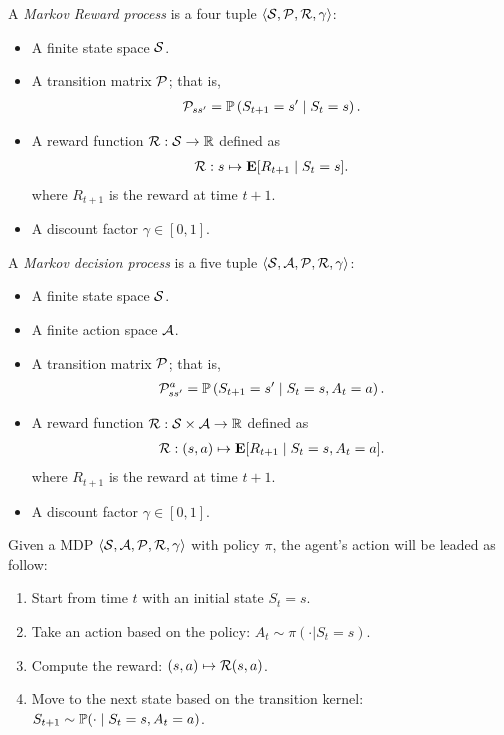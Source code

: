 \begin{definition}
	\label{MDP}
	A \textit{Markov Reward process} is a four tuple $\langle \mathcal{S}, \mathcal{P}, \mathcal{R}, \gamma \rangle$:
	\begin{itemize}
		\item A finite state space $\mathcal{S}$. 
		
		\item A transition matrix $\mathcal{P}$; that is,
		\begin{align*}
		\mathcal{P}_{ss'} = \mathbb{P}\left( S_{t+1} = s' \mid S_t = s \right).
		\end{align*} 
		
		\item A reward function $\mathcal{R}:\mathcal{S} \to \mathbb{R}$ defined as
		\begin{align*}
		\mathcal{R}: s \mapsto \mathbf{E}[ R_{t+1} \mid S_t = s  ].
		\end{align*}
		where $R_{t+1}$ is the reward at time $t+1$. 
		\item A discount factor $\gamma \in [0,1]$.
	\end{itemize} 
A \textit{Markov decision process} is a five tuple $\langle \mathcal{S}, \mathcal{A}, \mathcal{P}, \mathcal{R}, \gamma \rangle$:
	\begin{itemize}
		\item A finite state space $\mathcal{S}$. 
		
		\item A finite action space $\mathcal{A}$.
		
		\item A transition matrix $\mathcal{P}$; that is,
		\begin{align*}
		\mathcal{P}^a_{ss'} = \mathbb{P}\left( S_{t+1} = s' \mid S_t = s, A_t = a \right).
		\end{align*} 
		
		\item A reward function $\mathcal{R}:\mathcal{S} \times \mathcal{A} \to \mathbb{R}$ defined as
		\begin{align*}
		\mathcal{R}: (s,a) \mapsto \mathbf{E}[ R_{t+1} \mid S_t = s , A_t = a ].
		\end{align*}
		where $R_{t+1}$ is the reward at time $t+1$. 
		\item A discount factor $\gamma \in [0,1]$.
	\end{itemize}
\end{definition}  
 

\begin{example}
	Given a MDP $\langle \mathcal{S}, \mathcal{A}, \mathcal{P}, \mathcal{R}, \gamma \rangle$ with policy $\pi$, the agent's action will be leaded as follow:
	\begin{enumerate}[1)] 
		\item Start from time $t$ with an initial state $S_t = s$. 
		\item Take an action based on the policy: $A_t \sim \pi(  \cdot  |S_t = s )$.
		\item Compute the reward: $(s, a) \mapsto \mathcal{R}(s, a) $.
		\item Move to the next state based on the transition kernel: $S_{t+1} \sim \mathbb{P}( \cdot \mid S_t =s, A_t = a )$. 
	\end{enumerate} 
\end{example}


